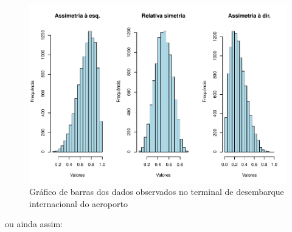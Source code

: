 \documentclass[
]{book}
\begin{document}
\begin{figure}
\includegraphics[width=0.8\linewidth]{apostila_files/figure-latex/unnamed-chunk-40-1} \caption{Gráfico de barras dos dados observados no terminal de desembarque internacional do aeroporto}\label{fig:unnamed-chunk-40}
\end{figure}

\hfill\break

ou ainda assim:

\hfill\break
\end{document}
